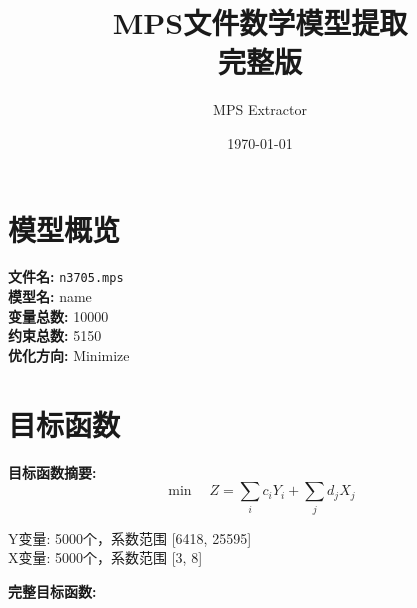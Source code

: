 \documentclass[a4paper,10pt]{article}
\title{MPS文件数学模型提取\\{\large 完整版}}
\author{MPS Extractor}
\date{\today}
\begin{document}
\maketitle
\tableofcontents
\newpage

\section{模型概览}

\textbf{文件名:} \texttt{n3705.mps} \\
\textbf{模型名:} name \\
\textbf{变量总数:} 10000 \\
\textbf{约束总数:} 5150 \\
\textbf{优化方向:} Minimize \\

\section{目标函数}

\textbf{目标函数摘要:}
\begin{equation}
\min \quad Z = \sum_{i} c_i Y_i + \sum_{j} d_j X_j
\end{equation}

Y变量: 5000个，系数范围 [6418, 25595] \\
X变量: 5000个，系数范围 [3, 8]

\textbf{完整目标函数:}
\end{document}
